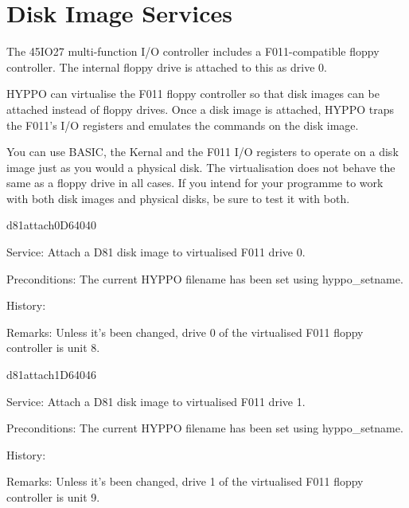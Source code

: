 \newpage
\section{Disk Image Services}

The 45IO27 multi-function I/O controller includes a F011-compatible floppy
controller. The internal floppy drive is attached to this as drive 0.

HYPPO can virtualise the F011 floppy controller so that disk images
can be attached instead of floppy drives. Once a disk image is attached,
HYPPO traps the F011's I/O registers and emulates the commands on the disk
image.

You can use BASIC, the Kernal and the F011 I/O registers to operate on a disk
image just as you would a physical disk. The virtualisation does not behave the
same as a floppy drive in all cases. If you intend for your programme to work
with both disk images and physical disks, be sure to test it with both.


\begin{hyppotrap}{d81attach0}{D640}{40}
\item [Service:]
  Attach a D81 disk image to virtualised F011 drive 0.
\item [Preconditions:]
  The current HYPPO filename has been set using hyppo\_setname.
\item [History:]
\item [Remarks:]
  Unless it's been changed, drive 0 of the virtualised F011 floppy controller is
  unit 8.
\end{hyppotrap}


\newpage
\begin{hyppotrap}{d81attach1}{D640}{46}
\item [Service:]
  Attach a D81 disk image to virtualised F011 drive 1.
\item [Preconditions:]
  The current HYPPO filename has been set using hyppo\_setname.
\item [History:]
\item [Remarks:]
  Unless it's been changed, drive 1 of the virtualised F011 floppy controller is
  unit 9.
\end{hyppotrap}


